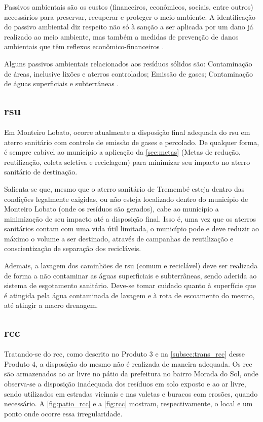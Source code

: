 Passivos ambientais são os custos (financeiros, econômicos, sociais, entre outros) necessários para preservar, recuperar e proteger o meio ambiente. A identificação do passivo ambiental diz respeito não só à sanção a ser aplicada por um dano já realizado ao meio ambiente, mas também a medidas de prevenção de danos ambientais que têm reflexos econômico-financeiros \cite{agevap_manual_2019}.

Alguns passivos ambientais relacionados aos resíduos sólidos são: Contaminação de áreas, inclusive lixões e aterros controlados; Emissão de gases; Contaminação de águas superficiais e subterrâneas \cite{agevap_manual_2019}.

\subsection{\gls{rsu}}
Em Monteiro Lobato, ocorre atualmente a disposição final adequada do \gls{rsu} em aterro sanitário com controle de emissão de gases e percolado. De qualquer forma, é sempre cabível ao município a aplicação da \autoref{sec:metas} (Metas de redução, reutilização, coleta seletiva e reciclagem) para minimizar seu impacto no aterro sanitário de destinação.

Salienta-se que, mesmo que o aterro sanitário de Tremembé esteja dentro das condições legalmente exigidas, ou não esteja localizado dentro do município de Monteiro Lobato (onde os resíduos são gerados), cabe ao município a minimização de seu impacto até a disposição final. Isso é, uma vez que os aterros sanitários contam com uma vida útil limitada, o município pode e deve reduzir ao máximo o volume a ser destinado, através de campanhas de reutilização e conscientização de separação dos recicláveis.

Ademais, a lavagem dos caminhões de \gls{rsu} (comum e reciclável) deve ser realizada de forma a não contaminar as águas superficiais e subterrâneas, sendo aderida ao sistema de esgotamento sanitário. Deve-se tomar cuidado quanto à superfície que é atingida pela água contaminada de lavagem e à rota de escoamento do mesmo, até atingir a macro drenagem.


\subsection{\gls{rcc}}
Tratando-se do \gls{rcc}, como descrito no Produto 3 e na \autoref{subsec:trans_rcc} desse Produto 4, a disposição do mesmo não é realizada de maneira adequada. Os \gls{rcc} são armazenados ao ar livre no pátio da prefeitura no bairro Morada do Sol,  onde observa-se a disposição inadequada dos resíduos em solo exposto e ao ar livre, sendo utilizados em estradas vicinais e nas valetas e buracos com erosões, quando necessário. A \autoref{fig:patio_rcc} e a \autoref{fig:rcc} mostram, respectivamente, o local e um ponto onde ocorre essa irregularidade.


